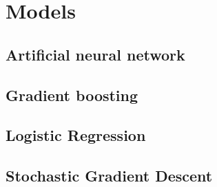 \section{Models}

\subsection{Artificial neural network}

\subsection{Gradient boosting}

\subsection{Logistic Regression}

\subsection{Stochastic Gradient Descent}


